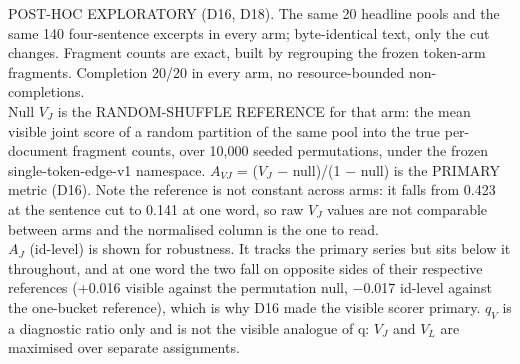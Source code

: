 \begin{table}[t]
\centering
\footnotesize
\setlength{\tabcolsep}{3pt}
\caption{POST-HOC EXPLORATORY granularity gradient: five cuts of identical text on the same 20 pools.}
\label{tab:gradient}
\ifdim\wd0>\textwidth\resizebox{\textwidth}{!}{\usebox0}\else\usebox0\fi
\begin{flushleft}\footnotesize
POST-HOC EXPLORATORY (D16, D18). The same 20 headline pools and the same 140 four-sentence excerpts in every arm; byte-identical text, only the cut changes. Fragment counts are exact, built by regrouping the frozen token-arm fragments. Completion 20/20 in every arm, no resource-bounded non-completions.\\
Null $V_{J}$ is the RANDOM-SHUFFLE REFERENCE for that arm: the mean visible joint score of a random partition of the same pool into the true per-document fragment counts, over 10,000 seeded permutations, under the frozen single-token-edge-v1 namespace. $A_{VJ}$ = ($V_{J}$ $-$ null)/(1 $-$ null) is the PRIMARY metric (D16). Note the reference is not constant across arms: it falls from 0.423 at the sentence cut to 0.141 at one word, so raw $V_{J}$ values are not comparable between arms and the normalised column is the one to read.\\
$A_{J}$ (id-level) is shown for robustness. It tracks the primary series but sits below it throughout, and at one word the two fall on opposite sides of their respective references (+0.016 visible against the permutation null, $-$0.017 id-level against the one-bucket reference), which is why D16 made the visible scorer primary. $q_{V}$ is a diagnostic ratio only and is not the visible analogue of q: $V_{J}$ and $V_{L}$ are maximised over separate assignments.\\

\end{flushleft}
\end{table}
